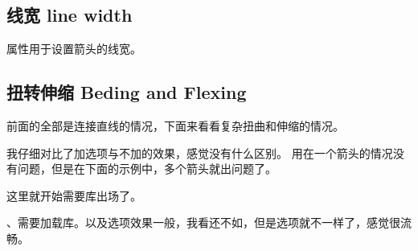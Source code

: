 \subsection{线宽 line width}
属性用于设置箭头的线宽。

\subsection{扭转伸缩 Beding and Flexing}
前面的全部是连接直线的情况，下面来看看复杂扭曲和伸缩的情况。
\begin{texlst}
	\def\wall{\fill [fill=black!50] (1,-0.5) rectangle (2, 0.5);
		\pattern [pattern=bricks] (1,-0.5) rectangle (2,0.5);
		\draw [line width=1pt] (1cm+0.5pt, -0.5) -- ++(0,1);}
\end{texlst}
我仔细对比了加选项与不加的效果，感觉没有什么区别。
用在一个箭头的情况没有问题，但是在下面的示例中，多个箭头就出问题了。
\begin{texlst}
	\def\wall{\fill [fill=black!50] (1,-0.5) rectangle (2, 0.5);
		\pattern [pattern=bricks] (1,-0.5) rectangle (2,0.5);
		\draw [line width=1pt] (1cm+0.5pt, -0.5) -- ++(0,1);}
\end{texlst}
这里就开始需要库出场了。

、需要加载库。以及选项效果一般，我看还不如，但是选项就不一样了，感觉很流畅。
\begin{texlst}
	\usetikzlibrary{arrows.meta, bending}
	\def\wall{\fill [fill=black!50] (1,-0.5) rectangle (2, 0.5);
		\pattern [pattern=bricks] (1,-0.5) rectangle (2,0.5);
		\draw [line width=1pt] (1cm+0.5pt, -0.5) -- ++(0,1);}
\end{texlst}

